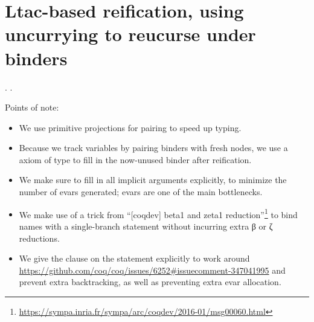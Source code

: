 \begin{coqdoccode}
\end{coqdoccode}
\section{Ltac-based reification, using uncurrying to reucurse under binders}

\begin{coqdoccode}
\coqdocnoindent
{}  .\coqdoceol
\coqdocnoindent
{}  .\coqdoceol
\coqdocemptyline
\end{coqdoccode}
Points of note:



\begin{itemize}
\item  We use primitive projections for pairing to speed up typing.



\item  Because we track variables by pairing  binders with fresh
       nodes, we use a  axiom of type  to fill in
      the now-unused  binder after reification.



\item  We make sure to fill in all implicit arguments explicitly, to
      minimize the number of evars generated; evars are one of the
      main bottlenecks.



\item  We make use of a trick from ``[coqdev] beta1 and zeta1
      reduction''\footnote{\url{https://sympa.inria.fr/sympa/arc/coqdev/2016-01/msg00060.html}}
      to bind names with a single-branch  statement without
      incurring extra β or ζ reductions.



\item  We give the  clause on the  statement explicitly
      to work around
      \url{https://github.com/coq/coq/issues/6252\#issuecomment-347041995}
      and prevent extra backtracking, as well as preventing extra evar
      allocation. 
\end{itemize}
